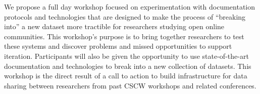 We propose a full day workshop focused on
experimentation with documentation protocols and
technologies that are designed to make the process
of ``breaking into'' a new dataset more tractible for 
researchers studying open online communities.
This workshop's purpose is to bring together researchers
to test these systems and discover problems and missed
opportunities to support iteration.  Participants
will also be given the opportunity to use state-of-the-art
documentation and technologies to break into a new collection
of datasets.  This workshop is the direct result of a call
to action to build infrastructure for data sharing
between researchers from past CSCW workshops and related
conferences.
